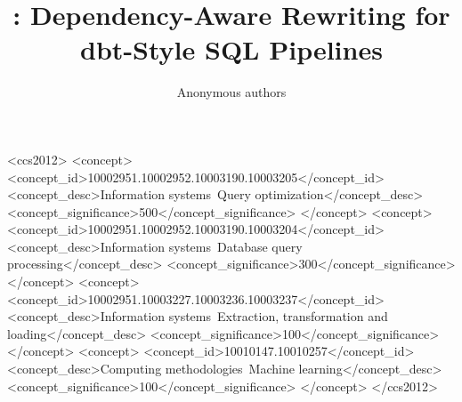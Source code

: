 \documentclass[sigconf]{acmart}
\begin{document}


\title{\tool: Dependency-Aware Rewriting for dbt-Style SQL Pipelines}


\author{Anonymous authors}

\renewcommand{\shortauthors}{Anonymous Author(s)}









\begin{CCSXML}
<ccs2012>
 <concept>
  <concept_id>10002951.10002952.10003190.10003205</concept_id>
  <concept_desc>Information systems~Query optimization</concept_desc>
  <concept_significance>500</concept_significance>
 </concept>
 <concept>
  <concept_id>10002951.10002952.10003190.10003204</concept_id>
  <concept_desc>Information systems~Database query processing</concept_desc>
  <concept_significance>300</concept_significance>
 </concept>
 <concept>
  <concept_id>10002951.10003227.10003236.10003237</concept_id>
  <concept_desc>Information systems~Extraction, transformation and loading</concept_desc>
  <concept_significance>100</concept_significance>
 </concept>
 <concept>
  <concept_id>10010147.10010257</concept_id>
  <concept_desc>Computing methodologies~Machine learning</concept_desc>
  <concept_significance>100</concept_significance>
 </concept>
</ccs2012>
\end{CCSXML}
 
 
\end{document}

